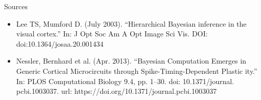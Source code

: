 \documentclass[aspectratio=169]{beamer}
\begin{document}
\begin{frame}{Sources}
    \begin{itemize}
    \item  Lee TS, Mumford D. (July 2003). “Hierarchical Bayesian inference in the
 visual cortex.” In: J Opt Soc Am A Opt Image Sci Vis. DOI: doi:10.1364/josaa.20.001434
    \item Nessler, Bernhard et al. (Apr. 2013). “Bayesian Computation Emerges in
 Generic Cortical Microcircuits through Spike-Timing-Dependent Plastic
ity.” In: PLOS Computational Biology 9.4, pp. 1–30. doi: 10.1371/journal.
 pcbi.1003037. url: https://doi.org/10.1371/journal.pcbi.1003037
  \end{itemize}

\end{frame}
\end{document}
